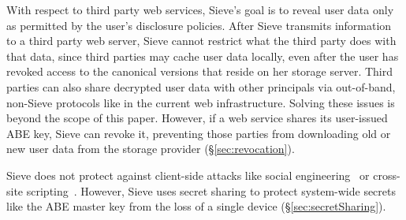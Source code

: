 With respect to third party web services,
Sieve's goal is to reveal user data only
as permitted by the user's disclosure
policies. After Sieve transmits information
to a third party web server, Sieve cannot
restrict what the third party does with that
data, since third parties may cache user data
locally, even after the user has revoked access
to the canonical versions that reside on her
storage server. Third parties can also share 
decrypted user data with other
principals via out-of-band, non-Sieve protocols
like in the current web infrastructure.
Solving these issues is beyond the scope of
this paper. However, if a web service shares its user-issued
ABE key, Sieve can revoke it, preventing
those parties from downloading old or new
user data from the storage provider
(\S\ref{sec:revocation}).

Sieve does not protect against client-side
attacks like social engineering~\cite{socialEngineering}
or cross-site scripting~\cite{xss}.
However, Sieve uses secret sharing to
protect system-wide secrets like the ABE
master key from the loss of a single device
(\S\ref{sec:secretSharing}).
